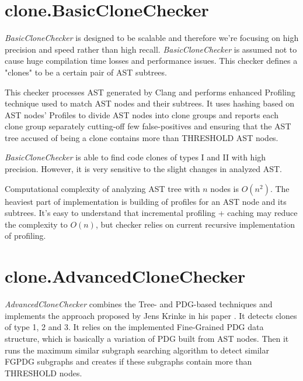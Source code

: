 \documentclass[a0,portrait]{a0poster}
\begin{document}
\begin{multicols}{2}

\section*{clone.BasicCloneChecker}

\textit{BasicCloneChecker} is designed to be scalable and therefore we're focusing on
high precision and speed rather than high recall. \textit{BasicCloneChecker} is assumed
not to cause huge compilation time losses and performance issues. This checker defines a
"clones" to be a certain pair of AST subtrees.

This checker processes AST generated by Clang and performs enhanced Profiling technique
used to match AST nodes and their subtrees. It uses hashing based on AST nodes'
Profiles to divide AST nodes into clone groups and reports each clone group separately
cutting-off few false-positives and ensuring that the AST tree accused of being a clone
contains more than THRESHOLD AST nodes.

\textit{BasicCloneChecker} is able to find code clones of types I and II with high
precision. However, it is very sensitive to the slight changes in analyzed AST.

Computational complexity of analyzing AST tree with $n$ nodes is $O(n^2)$. The heaviest
part of implementation is building of profiles for an AST node and its subtrees. It's
easy to understand that incremental profiling + caching may reduce the complexity to
$O(n)$, but checker relies on current recursive implementation of profiling.


\section*{clone.AdvancedCloneChecker}

\textit{AdvancedCloneChecker} combines the Tree- and PDG-based techniques and implements
the approach proposed by Jens Krinke in his paper \cite{FineGrainedPDG}. It detects
clones of type 1, 2 and 3. It relies on the implemented Fine-Grained PDG data structure,
which is basically a variation of PDG built from AST  nodes. Then it runs the maximum
similar subgraph searching algorithm to detect similar FGPDG subgraphs and creates if
these subgraphs contain more than THRESHOLD nodes.


\end{multicols}
\end{document}
